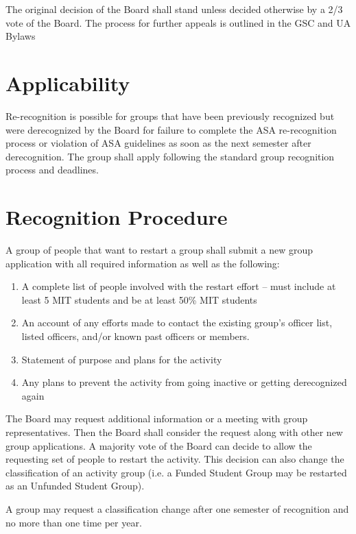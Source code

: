\documentclass[12pt]{constitution}
\begin{document}
The original decision of the Board shall stand unless decided otherwise by a 2/3 vote of the Board. The
    process for further appeals is outlined in the GSC and UA Bylaws


\section{Applicability}
Re-recognition is possible for groups that have been previously recognized but were derecognized by the
    Board for failure to complete the ASA re-recognition process or violation of ASA guidelines as soon
    as the next semester after derecognition.
The group shall apply following the standard group recognition process and deadlines.

\section{Recognition Procedure}
A group of people that want to restart a group shall submit a new group application with all required
    information as well as the following:
\begin{enumerate}
    \item A complete list of people involved with the restart effort -- must include at least 5 MIT
        students and be at least 50\% MIT students
    \item An account of any efforts made to contact the existing group's officer list, listed officers,
        and/or known past officers or members.
    \item Statement of purpose and plans for the activity
    \item Any plans to prevent the activity from going inactive or getting derecognized again
\end{enumerate}
The Board may request additional information or a meeting with group representatives.
Then the Board shall consider the request along with other new group applications.
A majority vote of the Board can decide to allow the requesting set of people to restart the activity.
This decision can also change the classification of an activity group (i.e. a Funded Student Group
    may be restarted as an Unfunded Student Group).

A group may request a classification change after one semester of recognition and no more than one
    time per year.
\\
\end{document}
